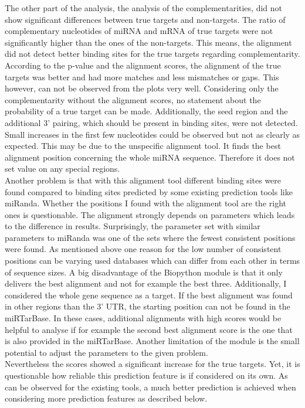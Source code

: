 \documentclass[11pt, a4paper, twoside]{book}
\begin{document}
The other part of the analysis, the analysis of the complementarities, did not show significant differences between true targets and non-targets. The ratio of complementary nucleotides of miRNA and mRNA of true targets were not significantly higher than the ones of the non-targets. This means, the alignment did not detect better binding sites for the true targets regarding complementarity. According to the p-value and the alignment scores, the alignment of the true targets was better and had more matches and less mismatches or gaps. This however, can not be observed from the plots very well. Considering only the complementarity without the alignment scores, no statement about the probability of a true target can be made. Additionally, the seed region and the additional 3' pairing, which should be present in binding sites, were not detected. Small increases in the first few nucleotides could be observed but not as clearly as expected. This may be due to the unspecific alignment tool. It finds the best alignment position concerning the whole miRNA sequence. Therefore it does not set value on any special regions.  \\

Another problem is that with this alignment tool different binding sites were found compared to binding sites predicted by some existing prediction tools like miRanda. Whether the positions I found with the alignment tool are the right ones is questionable. The alignment strongly depends on parameters which leads to the difference in results. Surprisingly, the parameter set with similar parameters to miRanda was one of the sets where the fewest consistent positions were found. As mentioned above one reason for the low number of consistent positions can be varying used databases which can differ from each other in terms of sequence sizes. A big disadvantage of the Biopython module is that it only delivers the best alignment and not for example the best three. Additionally, I considered the whole gene sequence as a target. If the best alignment was found in other regions than the 3' UTR, the starting position can not be found in the miRTarBase. In these cases, additional alignments with high scores would be helpful to analyse if for example the second best alignment score is the one that is also provided in the miRTarBase. Another limitation of the module is the small potential to adjust the parameters to the given problem. \\

Nevertheless the scores showed a significant increase for the true targets. Yet, it is questionable how reliable this prediction feature is if considered on its own. As can be observed for the existing tools, a much better prediction is achieved when considering more prediction features as described below.\\
\end{document}

